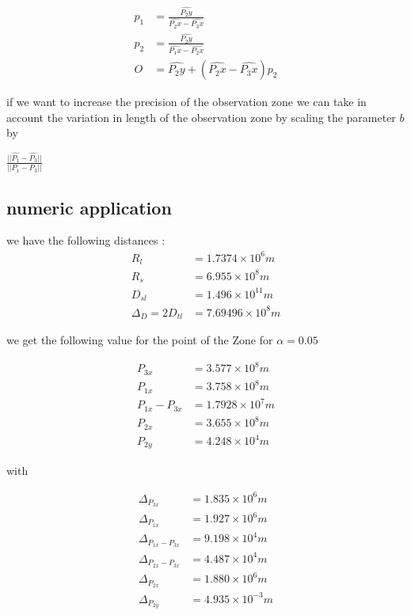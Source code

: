 \documentclass{article} %
\begin{document}
		$$
		\begin{align}
			p_1&=\frac{\hat{P_2y}}{\hat{P_2x}-\hat{P_3x}}\\
			p_2&=\frac{\hat{P_2y}}{\hat{P_1x}-\hat{P_2x}}\\
			O&=\hat{P_2y}+(\hat{P_2x}-\hat{P_3x})p_2
		\end{align}	
		$$ 
		
		
		
		if we want to increase the precision of the observation zone we can take in account the variation in length of the observation zone by scaling the parameter $b$ by 
		
		
		$\frac{||\hat{P_1}-\hat{P_3}||}{||P_1-P_3||}$		
		\subsection{numeric application}
		we have the following distances : 
		$$
		\begin{align}
			R_l&=1.7374\times10^6 m \\
			R_s&=6.955\times10^8 m \\ 
			D_{sl}&=1.496\times10^{11} m \\
			\Delta_D=2D_{tl}&= 7.69496\times10^8 m
		\end{align}
		$$
		
		we get the following value for the point of the Zone for $\alpha=0.05$
		
		$$
		\begin{align}
			P_{3x}&=3.577\times10^8 m \\
			P_{1x}&=3.758\times10^8 m \\ 
			P_{1x}-P_{3x}&=1.7928\times10^7 m \\ 
			P_{2x}&=3.655\times10^8 m \\
			P_{2y}&= 4.248\times10^4 m
		\end{align}
		$$
		
		with
		
		$$
		\begin{align}
			\Delta_{P_{3x}}&=1.835\times10^6 m \\
			\Delta_{P_{1x}}&=1.927\times10^6 m \\ 
			\Delta_{P_{1x}-P_{3x}}&=9.198\times10^4 m \\ 
			\Delta_{P_{2x}-P_{3x}}&=4.487\times10^4 m \\ 
			\Delta_{P_{2x}}&=1.880\times10^6 m \\
			\Delta_{P_{2y}}&= 4.935\times10^{-3} m
		\end{align}
		$$
		
\end{document}
